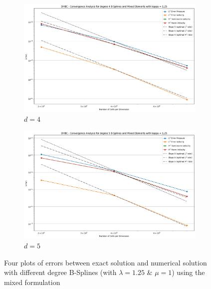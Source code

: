 \documentclass[a4paper,12pt,twoside]{report}
\begin{document}
\begin{figure}[!h]
	\\
	\begin{subfigure}[b]{0.49\textwidth}
		\centering
		\includegraphics[width=\textwidth]{convergence_degree_4_mixed_dirichlet_homogeneous_kappa=1.25}
		\caption{$d=4$}
		\label{fig:convergencedegree4mixeddirichlethomogeneouskappa1}
	\end{subfigure}
	\begin{subfigure}[b]{0.49\textwidth}
		\centering
		\includegraphics[width=\textwidth]{convergence_degree_5_mixed_dirichlet_homogeneous_kappa=1.25}
		\caption{$d=5$}
		\label{fig:convergencedegree5mixeddirichlethomogeneouskappa1}
	\end{subfigure}
	\caption{Four plots of errors between exact solution and numerical solution with different degree B-Splines (with $\lambda = 1.25$  \& $\mu = 1$) using the mixed formulation}
\end{figure}
\end{document}
